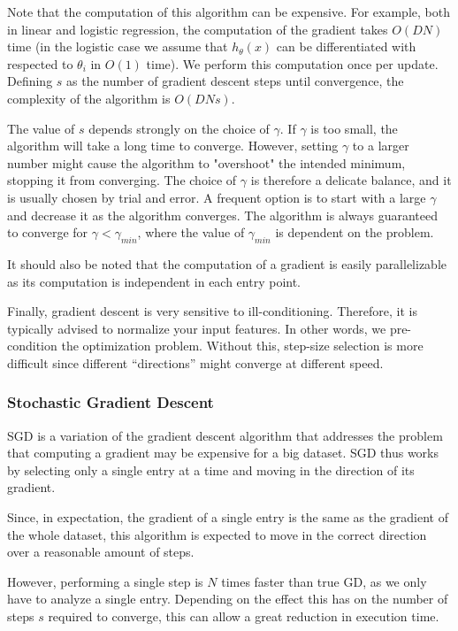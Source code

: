 \documentclass{article}
\begin{document}
Note that the computation of this algorithm can be expensive. 
For example, both in linear and logistic regression, the computation of the gradient takes $O(DN)$ time (in the logistic case we assume that $h_\theta(x)$ can be differentiated with respected to $\theta_i$ in $O(1)$ time).
We perform this computation once per update.
Defining $s$ as the number of gradient descent steps until convergence, the complexity of the algorithm is $O(DNs)$.

The value of $s$ depends strongly on the choice of $\gamma$.
If $\gamma$ is too small, the algorithm will take a long time to converge.
However, setting $\gamma$ to a larger number might cause the algorithm to "overshoot" the intended minimum, stopping it from converging.
The choice of $\gamma$ is therefore a delicate balance, and it is usually chosen by trial and error.
A frequent option is to start with a large $\gamma$ and decrease it as the algorithm converges.
The algorithm is always guaranteed to converge for $\gamma < \gamma_{min}$, where the value of $\gamma_{min}$ is dependent on the problem.

It should also be noted that the computation of a gradient is easily parallelizable as its computation is independent in each entry point.

Finally, gradient descent is very sensitive to ill-conditioning.
Therefore, it is typically advised to normalize your input features.
In other words, we pre-condition the optimization problem.
Without this, step-size selection is more difficult since different “directions” might converge at different speed.

\subsubsection{Stochastic Gradient Descent} 

SGD is a variation of the gradient descent algorithm that addresses the problem that computing a gradient may be expensive for a big dataset.
SGD thus works by selecting only a single entry at a time and moving in the direction of its gradient.  

Since, in expectation, the gradient of a single entry is the same as the gradient of the whole dataset, this algorithm is expected to move in the correct direction over a reasonable amount of steps.  

However, performing a single step is $N$ times faster than true GD, as we only have to analyze a single entry.
Depending on the effect this has on the number of steps $s$ required to converge, this can allow a great reduction in execution time.
\end{document}
